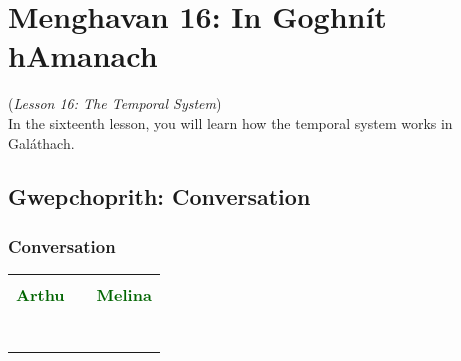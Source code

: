 \section{Menghavan 16: In Goghn\'{i}t hAmanach}
(\textit{Lesson 16: The Temporal System})\\

In the sixteenth lesson, you will learn how the temporal system works in Gal\'{a}thach.

\subsection{Gwepchoprith: Conversation}
\subsubsection{Conversation}

\begin{table}[H]
\centering
    \begin{tabular}{M{3.0cm}M{10.0cm}M{3.0cm}}
     &  & \\
    \textcolor{darkgreen}{\textbf{Arthu}} &  & \textcolor{darkgreen}{\textbf{Melina}}\\
     &  & \\
     &  & \\
     &  & \\
     &  & \\
     &  & \\
     &  & \\
     &  & 
    \end{tabular}
\end{table}

